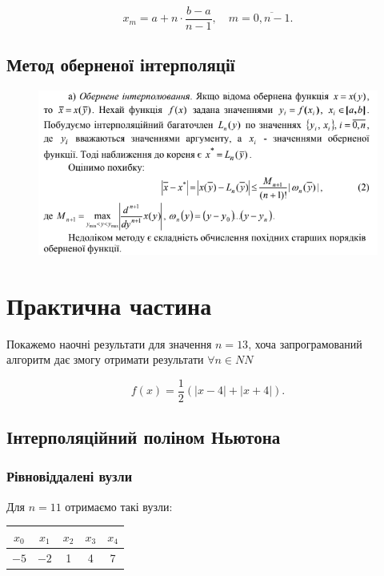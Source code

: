 \documentclass[12pt, a4paper]{article}
\theoremstyle{definition}
\numberwithin{equation}{section}
\begin{document}
\[ x_m = a + n \cdot \dfrac{b-a}{n-1}, \quad m=\overline{0,n-1}.\]

\subsection{Метод оберненої інтерполяції}

\begin{figure}[H]
	\centering
	\includegraphics[width=\linewidth]{inverse.png}
\end{figure}

\section{Практична частина}

Покажемо наочні результати для значення $n = 13$, хоча запрограмований алгоритм дає змогу отримати результати $\forall n \in NN$

\[ f(x) = \dfrac12(|x-4|+|x+4|).\]

\subsection{Інтерполяційний поліном Ньютона}
	
\subsubsection{Рівновіддалені вузли}

Для $n = 11$ отримаємо такі вузли:
\begin{table}[H]
	\centering
	\begin{tabular}{|c|c|c|c|c|}
	\hline
	$x_0$ & $x_1$ & $x_2$ & $x_3$ & $x_4$ \\ \hline
	$-5$ & $-2$ & 1 & 4 & 7 \\ \hline
	\end{tabular}
\end{table}
\end{document}
